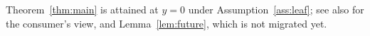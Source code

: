 
\begin{remark}\label{rem:aside}
Theorem~\ref{thm:main} is attained at $y = 0$ under
Assumption~\ref{ass:leaf}; see also  for the
consumer's view, and Lemma~\ref{lem:future}, which is not migrated yet.
\end{remark}
